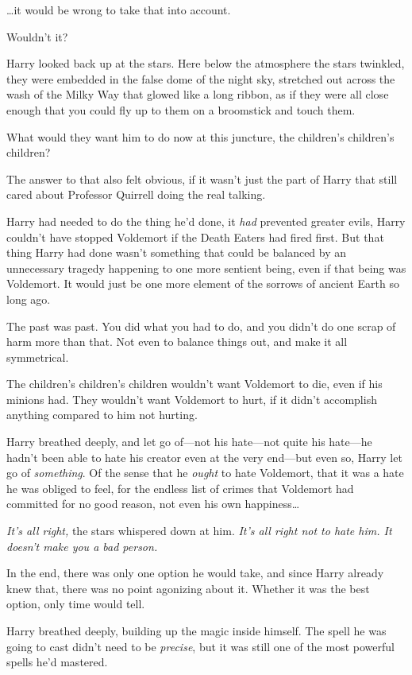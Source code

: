 …it would be wrong to take that into account.

Wouldn’t it?

Harry looked back up at the stars. Here below the atmosphere the stars twinkled, they were embedded in the false dome of the night sky, stretched out across the wash of the Milky Way that glowed like a long ribbon, as if they were all close enough that you could fly up to them on a broomstick and touch them.

What would they want him to do now at this juncture, the children’s children’s children?

The answer to that also felt obvious, if it wasn’t just the part of Harry that still cared about Professor Quirrell doing the real talking.

Harry had needed to do the thing he’d done, it \emph{had} prevented greater evils, Harry couldn’t have stopped Voldemort if the Death Eaters had fired first. But that thing Harry had done wasn’t something that could be balanced by an unnecessary tragedy happening to one more sentient being, even if that being was Voldemort. It would just be one more element of the sorrows of ancient Earth so long ago.

The past was past. You did what you had to do, and you didn’t do one scrap of harm more than that. Not even to balance things out, and make it all symmetrical.

The children’s children’s children wouldn’t want Voldemort to die, even if his minions had. They wouldn’t want Voldemort to hurt, if it didn’t accomplish anything compared to him not hurting.

Harry breathed deeply, and let go of—not his hate—not quite his hate—he hadn’t been able to hate his creator even at the very end—but even so, Harry let go of \emph{something}. Of the sense that he \emph{ought} to hate Voldemort, that it was a hate he was obliged to feel, for the endless list of crimes that Voldemort had committed for no good reason, not even his own happiness…

\emph{It’s all right,} the stars whispered down at him. \emph{It’s all right not to hate him. It doesn’t make you a bad person.}

In the end, there was only one option he would take, and since Harry already knew that, there was no point agonizing about it. Whether it was the best option, only time would tell.

Harry breathed deeply, building up the magic inside himself. The spell he was going to cast didn’t need to be \emph{precise}, but it was still one of the most powerful spells he’d mastered.

